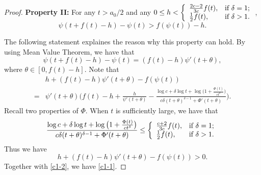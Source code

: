 \documentclass[reqno,12pt]{amsart}
\numberwithin{equation}{section}
\begin{document}
\begin{proof}
\noindent \textbf{Property II:} For any $t>a_0/2$ and any $0\leq h<\left\{
                                                                                                                                                      \begin{array}{ll}
                                                                                                                                                        \frac{2c-2}{3c}f(t), & \hbox{if $\delta=1$;} \\
                                                                                                                                                        \frac{1}{2}f(t), & \hbox{if $\delta>1$.}
                                                                                                                                                      \end{array}
                                                                                                               \right.$,
 \begin{equation}\label{c1-1}
 \psi(t+f(t)-h)-\psi(t)>f(\psi(t))-h.
 \end{equation}

The following statement explaines the reason why this property can hold. By using Mean Value Theorem, we have that
\begin{equation}\label{c1-2}
\psi(t+f(t)-h)-\psi(t)=(f(t)-h)\psi'(t+\theta),
\end{equation}
where $\theta\in [0,f(t)-h]$. Note that
	\begin{align*}
       & h+(f(t)-h)\psi'(t+\theta)-f(\psi(t))
		\\ = &
		\psi'(t+\theta)\Big(f(t)-h+\frac{h}{\psi'(t+\theta)}-\frac{\log c+\delta\log t+\log \big(1+\frac{\Phi(t)}{ct^{\delta}}\big)}{c\delta(t+\theta)^{\delta-1}+\Phi'(t+\theta)}\Big).
	\end{align*}
Recall two properties of $\Phi$. When $t$ is sufficiently large, we have that
$$\frac{\log c+\delta\log t+\log \big(1+\frac{\Phi(t)}{ct^{\delta}}\big)}{c\delta(t+\theta)^{\delta-1}+\Phi'(t+\theta)}\leq \left\{
                                                                                                                                                      \begin{array}{ll}
                                                                                                                                                        \frac{c+2}{3c}f(t), & \hbox{if $\delta=1$;} \\
                                                                                                                                                        \frac{1}{2}f(t), & \hbox{if $\delta>1$.}
                                                                                                                                                      \end{array}                                                                                                        \right.$$
 Thus we have
$$h+(f(t)-h)\psi'(t+\theta)-f(\psi(t))>0.$$
Together with \eqref{c1-2}, we have \eqref{c1-1}.


\end{proof}
\end{document}
